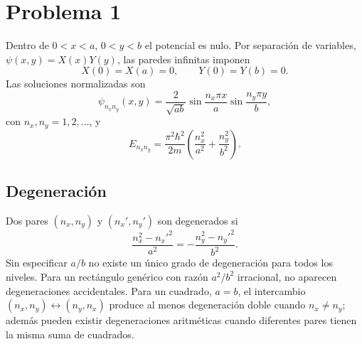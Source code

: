 \documentclass[11pt,a4paper]{article}
\numberwithin{equation}{section}
\renewcommand{\boxed}[1]{#1}
\newcommand{\hb}{\hbar}
\begin{document}
\section{Problema 1}
Dentro de $0<x<a$, $0<y<b$ el potencial es nulo. Por separación de variables, $\psi(x,y)=X(x)Y(y)$, las paredes infinitas imponen
\begin{equation}
X(0)=X(a)=0,\qquad Y(0)=Y(b)=0.
\end{equation}
Las soluciones normalizadas son
\begin{equation}
\boxed{\psi_{n_xn_y}(x,y)=\frac{2}{\sqrt{ab}}
\sin\frac{n_x\pi x}{a}\sin\frac{n_y\pi y}{b},}
\end{equation}
con $n_x,n_y=1,2,\ldots$, y
\begin{equation}
\boxed{E_{n_xn_y}=\frac{\pi^2\hb^2}{2m}
\left(\frac{n_x^2}{a^2}+\frac{n_y^2}{b^2}\right).}
\end{equation}

\subsection{Degeneración}
Dos pares $(n_x,n_y)$ y $(n_x',n_y')$ son degenerados si
\begin{equation}
\frac{n_x^2-n_x'^2}{a^2}=-\frac{n_y^2-n_y'^2}{b^2}.
\end{equation}
Sin especificar $a/b$ no existe un único grado de degeneración para todos los niveles. Para un rectángulo genérico con razón $a^2/b^2$ irracional, no aparecen degeneraciones accidentales. Para un cuadrado, $a=b$, el intercambio $(n_x,n_y)\leftrightarrow(n_y,n_x)$ produce al menos degeneración doble cuando $n_x\neq n_y$; además pueden existir degeneraciones aritméticas cuando diferentes pares tienen la misma suma de cuadrados.
\end{document}
